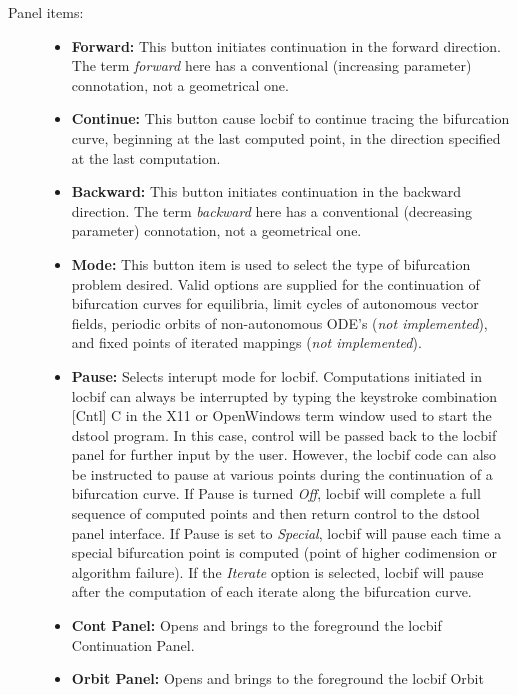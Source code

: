 \begin{description}
\item[Panel items:]\mbox{}
	\begin{itemize}
		\item {\bf Forward:}  This button initiates continuation in the forward direction.
		      The term {\em forward} here has a conventional (increasing parameter) 
		      connotation, not a geometrical one.
                \item {\bf Continue:}  This button cause locbif to continue tracing the bifurcation
		      curve, beginning at the last computed point, in the direction specified at
		      the last computation.
                \item {\bf  Backward:}  This button initiates continuation in the backward direction.
		      The term {\em backward} here has a conventional (decreasing parameter) 
		      connotation, not a geometrical one.
                \item {\bf Mode:}  This button item is used to select the type of bifurcation problem
		      desired.  Valid options are supplied for the continuation of bifurcation curves
		      for equilibria, limit cycles of autonomous vector fields, periodic orbits of
		      non-autonomous ODE's ({\em not implemented}), and fixed points of iterated
		      mappings ({\em not implemented}).
                \item {\bf Pause: }  Selects interupt mode for locbif.  Computations initiated in
		      locbif can always be interrupted by typing the keystroke combination
		      [Cntl] C in the X11 or OpenWindows term window used to start the dstool program.  
		      In this case, control will be passed back to the locbif panel for further
		      input by the user.  However, the locbif code can also be instructed to pause
		      at various points during the continuation of a bifurcation curve.  If Pause
		      is turned {\em Off}, locbif will complete a full sequence of computed points and then
		      return control to the dstool panel interface.  If Pause is set to {\em Special}, 
		      locbif will pause each time a special bifurcation point is computed (point of
		      higher codimension or algorithm failure).  If the {\em Iterate} option is selected, 
		      locbif will pause after the computation of each iterate along the bifurcation curve.
                \item {\bf Cont Panel: }  Opens and brings to the foreground the locbif Continuation
		      Panel.
                \item {\bf Orbit Panel: }  Opens and brings to the foreground the locbif Orbit

\end{itemize}
\end{description}
